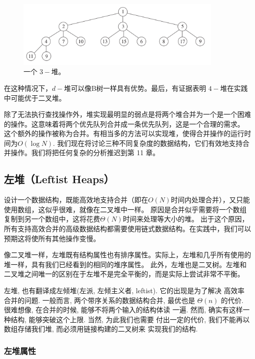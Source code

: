 \documentclass[a4paper]{ctexart}
\theoremstyle{definition}
\theoremstyle{definition}
\begin{document}
\setcounter{figure}{18}

\begin{figure}
  \centering
  \includegraphics[width=0.9\textwidth]{images/d_3_heap.png}
  \caption{一个 $3-$堆。}
  \label{fig::3-heap}
\end{figure}

在这种情况下，$d-$堆可以像B树一样具有优势。最后，有证据表明 $4-$堆在实践中可能优于二叉堆。

除了无法执行查找操作外，堆实现最明显的弱点是将两个堆合并为一个是一个困难的操作。这意味着将两个优先队列合并成一条优先队列，这是一个合理的需求。
这个额外的操作被称为合并。有相当多的方法可以实现堆，使得合并操作的运行时间为\(O(\log N)\). 
我们现在将讨论三种不同复杂度的数据结构，它们有效地支持合并操作。我们将把任何复杂的分析推迟到第 11 章。

\subsection{左堆（Leftist Heaps）}

设计一个数据结构，既能高效地支持合并（即在\(O(N)\)时间内处理合并），又只能使用数组，这似乎很难，就像在二叉堆中一样。
原因是合并似乎需要将一个数组复制到另一个数组中，这将花费\(\Theta(N)\)时间来处理等大小的堆。
出于这个原因，所有支持高效合并的高级数据结构都需要使用链式数据结构。在实践中，我们可以预期这将使所有其他操作变慢。

像二叉堆一样，左堆既有结构属性也有排序属性。实际上，左堆和几乎所有使用的堆一样，具有我们已经看到的相同的堆序属性。
此外，左堆也是二叉树。左堆和二叉堆之间唯一的区别在于左堆不是完全平衡的，而是实际上尝试非常不平衡。

左堆, 也有翻译成左倾堆(左派, 左倾主义者, leftist). 它的出现是为了解决
高效率合并的问题. 一般而言, 两个带序关系的数据结构合并, 最优也是
$\Theta(n)$ 的代价. 很难想像, 在合并的时候, 能够不将两个输入的结构体读
一遍. 然而, 确实有这样一种结构, 能够突破这个上限. 当然, 为此我们也需要
付出一定的代价, 我们不能再以数组存储我们堆, 而必须用链接构建的二叉树来
实现我们的结构.

\subsubsection{左堆属性}
\end{document}
